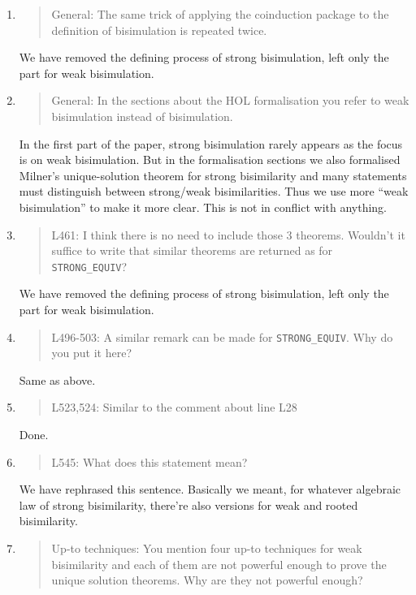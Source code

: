 \begin{enumerate}
\item \begin{quote}
    General: The same trick of applying the coinduction package to the
    definition of bisimulation is repeated twice.
  \end{quote}
  We have removed the defining process of strong bisimulation, left
  only the part for weak bisimulation.
  
\item \begin{quote}
    General: In the sections about the HOL formalisation you refer to
    weak bisimulation instead of bisimulation.    
  \end{quote}
  In the first part of the paper, strong bisimulation rarely appears
  as the focus is on weak bisimulation. But in the formalisation
  sections we also formalised Milner's unique-solution theorem for
  strong bisimilarity and many statements must distinguish between
  strong/weak bisimilarities. Thus we use more ``weak bisimulation''
  to make it more clear. This is not in conflict with anything.
  
\item \begin{quote}
    L461: I think there is no need to include those 3
    theorems. Wouldn’t it suffice to write that similar theorems are
    returned as for \texttt{STRONG\_EQUIV}?
  \end{quote}
  We have removed the defining process of strong bisimulation, left
  only the part for weak bisimulation.
  
\item \begin{quote}
    L496-503: A similar remark can be made for \texttt{STRONG\_EQUIV}. Why do you put it here?
  \end{quote}
  Same as above.

\item \begin{quote}
    L523,524: Similar to the comment about line L28
  \end{quote}
  Done.
  
\item \begin{quote}
    L545: What does this statement mean?
  \end{quote}
  We have rephrased this sentence. Basically we meant, for whatever
  algebraic law of strong bisimilarity, there're also versions for
  weak and rooted bisimilarity.

\item \begin{quote}
    Up-to techniques: You mention four up-to techniques for weak
    bisimilarity and each of them are not powerful enough to prove the
    unique solution theorems. Why are they not powerful enough?
  \end{quote}


\end{enumerate}
